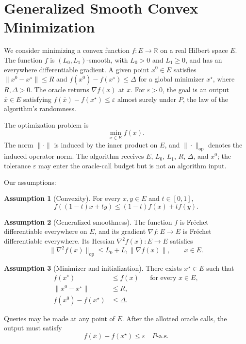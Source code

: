 \documentclass[10pt]{article}
\theoremstyle{definition}
\newtheorem{assumption}{Assumption}
\begin{document}
\section*{Generalized Smooth Convex Minimization}
We consider minimizing a convex function $f:E\to\mathbb{R}$ on a real Hilbert space $E$. The function $f$ is $(L_0,L_1)$-smooth, with $L_0>0$ and $L_1\geq0$, and has an everywhere differentiable gradient. A given point $x^0\in E$ satisfies $\|x^0-x^\star\|\leq R$ and $f(x^0)-f(x^\star)\leq\Delta$ for a global minimizer $x^\star$, where $R,\Delta>0$. The oracle returns $\nabla f(x)$ at $x$. For $\varepsilon>0$, the goal is an output $\bar{x}\in E$ satisfying $f(\bar{x})-f(x^\star)\leq\varepsilon$ almost surely under $P$, the law of the algorithm's randomness.

The optimization problem is
\[
\min_{x\in E} f(x).
\]
The norm $\|\cdot\|$ is induced by the inner product on $E$, and $\|\cdot\|_{\mathrm{op}}$ denotes the induced operator norm. The algorithm receives $E$, $L_0$, $L_1$, $R$, $\Delta$, and $x^0$; the tolerance $\varepsilon$ may enter the oracle-call budget but is not an algorithm input.

Our assumptions:
\begin{assumption}[Convexity]
For every $x,y\in E$ and $t\in[0,1]$,
\[
f((1-t)x+ty)\leq (1-t)f(x)+t f(y).
\]
\end{assumption}

\begin{assumption}[Generalized smoothness]
The function $f$ is Fr\'echet differentiable everywhere on $E$, and its gradient $\nabla f:E\to E$ is Fr\'echet differentiable everywhere. Its Hessian $\nabla^2 f(x):E\to E$ satisfies
\[
\|\nabla^2 f(x)\|_{\mathrm{op}}
\leq L_0+L_1\|\nabla f(x)\|,
\qquad x\in E.
\]
\end{assumption}

\begin{assumption}[Minimizer and initialization]
There exists $x^\star\in E$ such that
\[
\begin{aligned}
f(x^\star)&\leq f(x) &&\text{for every }x\in E,\\
\|x^0-x^\star\|&\leq R,\\
f(x^0)-f(x^\star)&\leq\Delta.
\end{aligned}
\]
\end{assumption}

Queries may be made at any point of $E$. After the allotted oracle calls, the output must satisfy
\[
f(\bar{x})-f(x^\star)\leq\varepsilon
\quad P\text{-a.s.}
\]
\end{document}
